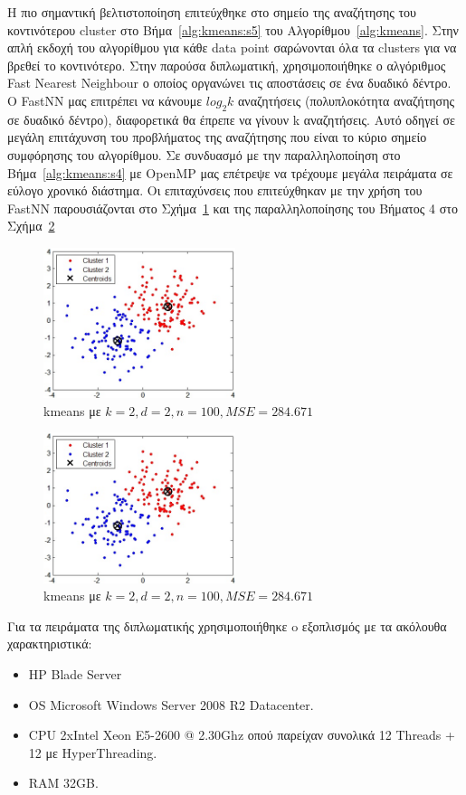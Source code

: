 \indent Η πιο σημαντική βελτιστοποίηση επιτεύχθηκε στο σημείο της αναζήτησης του κοντινότερου cluster στο Βήμα~\ref{alg:kmeans:s5} του Αλγορίθμου~\ref{alg:kmeans}. Στην απλή εκδοχή του αλγορίθμου για κάθε data point σαρώνονται όλα τα clusters για να βρεθεί το κοντινότερο. Στην παρούσα διπλωματική, χρησιμοποιήθηκε ο αλγόριθμος Fast Nearest Neighbour ο οποίος οργανώνει τις αποστάσεις σε ένα δυαδικό δέντρο. Ο FastNN μας επιτρέπει να κάνουμε $ log_{2} k $  αναζητήσεις (πολυπλοκότητα αναζήτησης σε δυαδικό δέντρο), διαφορετικά θα έπρεπε να γίνουν k αναζητήσεις. Αυτό οδηγεί σε μεγάλη επιτάχυνση του προβλήματος της αναζήτησης που είναι το κύριο σημείο συμφόρησης του αλγορίθμου. Σε συνδυασμό με την παραλληλοποίηση στο Βήμα~\ref{alg:kmeans:s4} με OpenMP μας επέτρεψε να τρέχουμε μεγάλα πειράματα σε εύλογο χρονικό διάστημα. Οι επιταχύνσεις που επιτεύχθηκαν με την χρήση του FastNN παρουσιάζονται στο Σχήμα~\ref{fig:fastnn} και της παραλληλοποίησης του Βήματος 4 στο Σχήμα~\ref{fig:ompiter}

\begin{figure}[ht!]
  \centering
  \includegraphics[width=0.5\textwidth]{chapter3/kmeans.jpg}
  \caption{kmeans με $k=2,d=2,n=100,MSE=284.671$}
  \label{fig:fastnn}
\end{figure}

\begin{figure}[ht!]
  \centering
  \includegraphics[width=0.5\textwidth]{chapter3/kmeans.jpg}
  \caption{kmeans με $k=2,d=2,n=100,MSE=284.671$}
  \label{fig:ompiter}
\end{figure}

\newpage
\indent Για τα πειράματα της διπλωματικής χρησιμοποιήθηκε o εξοπλισμός με τα ακόλουθα χαρακτηριστικά: 
\begin{itemize}
    \item HP Blade Server
    \item OS Microsoft Windows Server 2008 R2 Datacenter.
    \item CPU 2xIntel Xeon E5-2600 @ 2.30Ghz οπού παρείχαν συνολικά 12 Threads + 12 με HyperThreading.
    \item RAM 32GB.
\end{itemize} 
